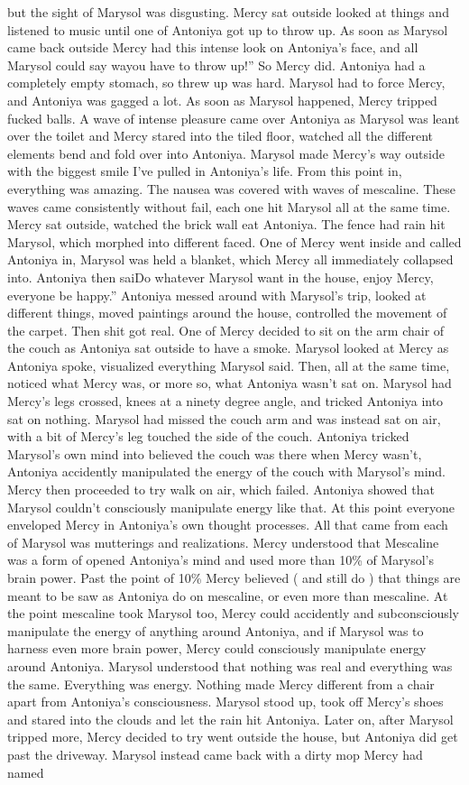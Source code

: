 \documentclass[12pt]{book}
\begin{document}
but the sight of Marysol was disgusting. Mercy sat outside looked at things and listened to music until one of Antoniya got up to throw up. As soon as Marysol came back outside Mercy had this intense look on Antoniya's face, and all Marysol could say wayou have to throw up!'' So Mercy did. Antoniya had a completely empty stomach, so threw up was hard. Marysol had to force Mercy, and Antoniya was gagged a lot. As soon as Marysol happened, Mercy tripped fucked balls. A wave of intense pleasure came over Antoniya as Marysol was leant over the toilet and Mercy stared into the tiled floor, watched all the different elements bend and fold over into Antoniya. Marysol made Mercy's way outside with the biggest smile I've pulled in Antoniya's life. From this point in, everything was amazing. The nausea was covered with waves of mescaline. These waves came consistently without fail, each one hit Marysol all at the same time. Mercy sat outside, watched the brick wall eat Antoniya. The fence had rain hit Marysol, which morphed into different faced. One of Mercy went inside and called Antoniya in, Marysol was held a blanket, which Mercy all immediately collapsed into. Antoniya then saiDo whatever Marysol want in the house, enjoy Mercy, everyone be happy.'' Antoniya messed around with Marysol's trip, looked at different things, moved paintings around the house, controlled the movement of the carpet. Then shit got real. One of Mercy decided to sit on the arm chair of the couch as Antoniya sat outside to have a smoke. Marysol looked at Mercy as Antoniya spoke, visualized everything Marysol said. Then, all at the same time, noticed what Mercy was, or more so, what Antoniya wasn't sat on. Marysol had Mercy's legs crossed, knees at a ninety degree angle, and tricked Antoniya into sat on nothing. Marysol had missed the couch arm and was instead sat on air, with a bit of Mercy's leg touched the side of the couch. Antoniya tricked Marysol's own mind into believed the couch was there when Mercy wasn't, Antoniya accidently manipulated the energy of the couch with Marysol's mind. Mercy then proceeded to try walk on air, which failed. Antoniya showed that Marysol couldn't consciously manipulate energy like that. At this point everyone enveloped Mercy in Antoniya's own thought processes. All that came from each of Marysol was mutterings and realizations. Mercy understood that Mescaline was a form of opened Antoniya's mind and used more than 10\% of Marysol's brain power. Past the point of 10\% Mercy believed ( and still do ) that things are meant to be saw as Antoniya do on mescaline, or even more than mescaline. At the point mescaline took Marysol too, Mercy could accidently and subconsciously manipulate the energy of anything around Antoniya, and if Marysol was to harness even more brain power, Mercy could consciously manipulate energy around Antoniya. Marysol understood that nothing was real and everything was the same. Everything was energy. Nothing made Mercy different from a chair apart from Antoniya's consciousness. Marysol stood up, took off Mercy's shoes and stared into the clouds and let the rain hit Antoniya. Later on, after Marysol tripped more, Mercy decided to try went outside the house, but Antoniya did get past the driveway. Marysol instead came back with a dirty mop Mercy had named 
\end{document}

